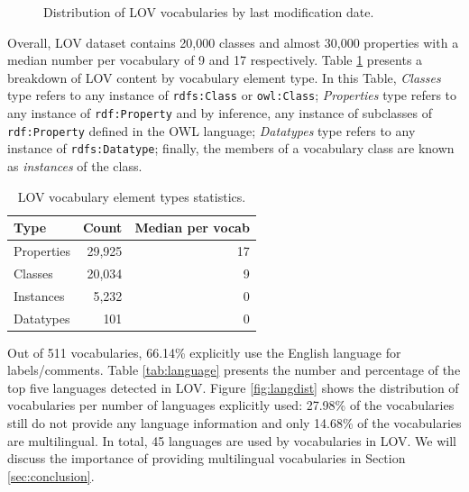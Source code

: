 \documentclass{iosart2c}
\begin{document}
\begin{figure}[htb]
\resizebox{\linewidth}{!}{}
\caption{\label{fig:modifevol} Distribution of LOV vocabularies by last modification date.}
\end{figure}


Overall, LOV dataset contains 20,000 classes and almost 30,000 properties with a median number per vocabulary of 9 and 17 respectively. Table \ref{tab:elements} presents a breakdown of LOV content by vocabulary element type. In this Table,  \emph{Classes} type refers to any instance of {\small\texttt{rdfs:Class}} or {\small\texttt{owl:Class}}; \emph{Properties} type refers to any instance of {\small\texttt{rdf:Property}} and by inference, any instance of subclasses of {\small\texttt{rdf:Property}} defined in the OWL language; \emph{Datatypes} type refers to any instance of {\small\texttt{rdfs:Datatype}}; finally, the members of a vocabulary class are known as \emph{instances} of the class.

\begin{table}[htb]
\caption{LOV vocabulary element types statistics.}
\begin{tabular}{lrr}
\hline
\textbf{Type} & \textbf{Count} &  \textbf{Median per vocab} \\ \hline
Properties & 29,925 & 17 \\
Classes & 20,034 & 9 \\
Instances & 5,232 & 0 \\
Datatypes & 101 & 0 \\
\hline  
\end{tabular}
\label{tab:elements}
\end{table}

Out of 511 vocabularies, 66.14\% explicitly use the English language for labels/comments. Table \ref{tab:language} presents the number and percentage of the top five languages detected in LOV. Figure \ref{fig:langdist} shows the distribution of vocabularies per number of languages explicitly used: 27.98\% of the vocabularies still do not provide any language information and only 14.68\% of the vocabularies are multilingual. In total, 45 languages are used by vocabularies in LOV. We will discuss the importance of providing multilingual vocabularies in Section \ref{sec:conclusion}.
\end{document}
